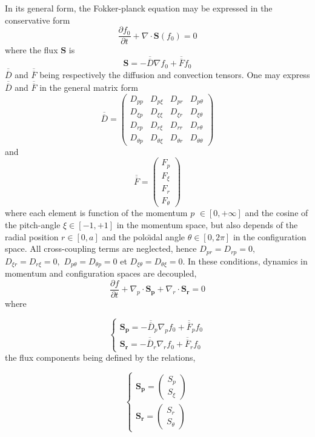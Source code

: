 In its general form, the Fokker-planck equation may be expressed in
the conservative form\[
\frac{\partial f_{0}}{\partial t}+\nabla\cdot\mathbf{S}\left(f_{0}\right)=0\]
 where the flux $\mathbf{S}$ is\[
\mathbf{S}=-\overline{\overline{D}}\nabla f_{0}+\overline{\overline{F}}f_{0}\]
 $\overline{\overline{D}}$ and $\overline{\overline{F}}$ being respectively
the diffusion and convection tensors. One may express $\overline{\overline{D}}$
and $\overline{\overline{F}}$ in the general matrix form \[
\overline{\overline{D}}=\left(\begin{array}{llll}
D_{pp} & D_{p\xi} & D_{pr} & D_{p\theta}\\
D_{\xi p} & D_{\xi\xi} & D_{\xi r} & D_{\xi\theta}\\
D_{rp} & D_{r\xi} & D_{rr} & D_{r\theta}\\
D_{\theta p} & D_{\theta\xi} & D_{\theta r} & D_{\theta\theta}\end{array}\right)\]
 and \[
\overline{\overline{F}}=\left(\begin{array}{l}
F_{p}\\
F_{\xi}\\
F_{r}\\
F_{\theta}\end{array}\right)\]
 where each element is function of the momentum $p$ $\in\left[0,+\infty\right]$
and the cosine of the pitch-angle $\xi\in\left[-1,+1\right]$ in the
momentum space, but also depends of the radial position $r\in\left[0,a\right]$
and the polo\"{\i}dal angle $\theta\in\left[0,2\pi\right]$ in the
configuration space. All cross-coupling terms are neglected, hence
$D_{pr}=D_{rp}=0,$ $D_{\xi r}=D_{r\xi}=0,$ $D_{p\theta}=D_{\theta p}=0$
et $D_{\xi\theta}=D_{\theta\xi}=0.$ In these conditions, dynamics
in momentum and configuration spaces are decoupled, \[
\frac{\partial f}{\partial t}+\nabla_{p}\cdot\mathbf{S}_{\mathbf{p}}+\nabla_{r}\cdot\mathbf{S}_{\mathbf{r}}=0\]
 where

\[
\left\{ \begin{array}{l}
\mathbf{S}_{\mathbf{p}}=-\overline{\overline{D}}_{p}\nabla_{p}f_{0}+\overline{\overline{F}}_{p}f_{0}\\
\mathbf{S}_{\mathbf{r}}=-\overline{\overline{D}}_{r}\nabla_{r}f_{0}+\overline{\overline{F}}_{r}f_{0}\end{array}\right.\]
 the flux components being defined by the relations,

\[
\left\{ \begin{array}{l}
\mathbf{S}_{\mathbf{p}}=\left(\begin{array}{l}
S_{p}\\
S_{\xi}\end{array}\right)\\
\mathbf{S}_{\mathbf{r}}=\left(\begin{array}{l}
S_{r}\\
S_{\theta}\end{array}\right)\end{array}\right.\]


